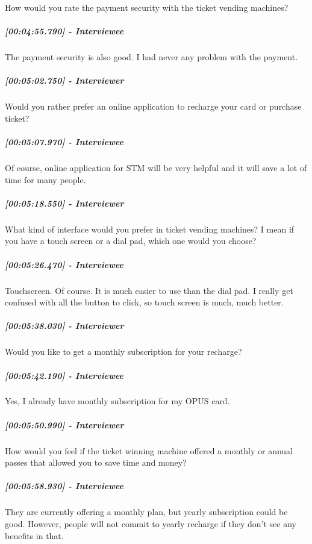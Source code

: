 \documentclass[a4paper,12pt]{article}
\begin{document}
How would you rate the payment security with the ticket vending
machines?

\hypertarget{interviewee-18}{%
\subparagraph{{[}00:04:55.790{]} - Interviewee}\label{interviewee-18}}

The payment security is also good. I had never any problem with the
payment.

\hypertarget{interviewer-24}{%
\subparagraph{{[}00:05:02.750{]} - Interviewer}\label{interviewer-24}}

Would you rather prefer an online application to recharge your card or
purchase ticket?

\hypertarget{interviewee-19}{%
\subparagraph{{[}00:05:07.970{]} - Interviewee}\label{interviewee-19}}

Of course, online application for STM will be very helpful and it will
save a lot of time for many people.

\hypertarget{interviewer-25}{%
\subparagraph{{[}00:05:18.550{]} - Interviewer}\label{interviewer-25}}

What kind of interface would you prefer in ticket vending machines? I
mean if you have a touch screen or a dial pad, which one would you
choose?

\hypertarget{interviewee-20}{%
\subparagraph{{[}00:05:26.470{]} - Interviewee}\label{interviewee-20}}

Touchscreen. Of course. It is much easier to use than the dial pad. I
really get confused with all the button to click, so touch screen is
much, much better.

\hypertarget{interviewer-26}{%
\subparagraph{{[}00:05:38.030{]} - Interviewer}\label{interviewer-26}}

Would you like to get a monthly subscription for your recharge?

\hypertarget{interviewee-21}{%
\subparagraph{{[}00:05:42.190{]} - Interviewee}\label{interviewee-21}}

Yes, I already have monthly subscription for my OPUS card.

\hypertarget{interviewer-27}{%
\subparagraph{{[}00:05:50.990{]} - Interviewer}\label{interviewer-27}}

How would you feel if the ticket winning machine offered a monthly or
annual passes that allowed you to save time and money?

\hypertarget{interviewee-22}{%
\subparagraph{{[}00:05:58.930{]} - Interviewee}\label{interviewee-22}}

They are currently offering a monthly plan, but yearly subscription
could be good. However, people will not commit to yearly recharge if
they don't see any benefits in that.
\end{document}
